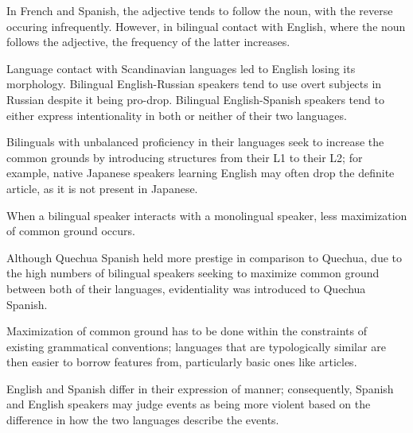 \documentclass{article}
\begin{document}
\clearpage

\problem
In French and Spanish, the adjective tends to follow the noun, with the reverse occuring infrequently. However, in bilingual contact with English, where the noun follows the adjective, the frequency of the latter increases.

\clearpage

\problem
Language contact with Scandinavian languages led to English losing its morphology. Bilingual English-Russian speakers tend to use overt subjects in Russian despite it being pro-drop. Bilingual English-Spanish speakers tend to either express intentionality in both or neither of their two languages.

\clearpage

\problem
Bilinguals with unbalanced proficiency in their languages seek to increase the common grounds by introducing structures from their L1 to their L2; for example, native Japanese speakers learning English may often drop the definite article, as it is not present in Japanese.

\clearpage

\problem
When a bilingual speaker interacts with a monolingual speaker, less maximization of common ground occurs.

\clearpage

\problem
Although Quechua Spanish held more prestige in comparison to Quechua, due to the high numbers of bilingual speakers seeking to maximize common ground between both of their languages, evidentiality was introduced to Quechua Spanish.

\clearpage

\problem
Maximization of common ground has to be done within the constraints of existing grammatical conventions; languages that are typologically similar are then easier to borrow features from, particularly basic ones like articles.

\clearpage

\problem
English and Spanish differ in their expression of manner; consequently, Spanish and English speakers may judge events as being more violent based on the difference in how the two languages describe the events.
\end{document}

